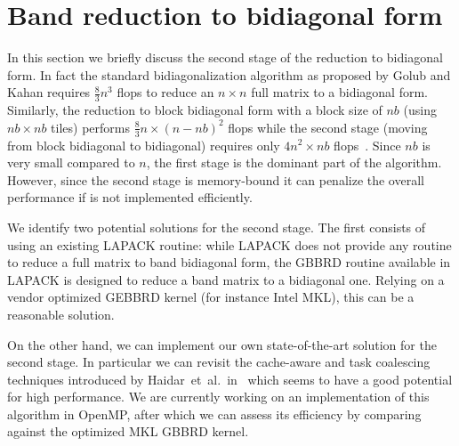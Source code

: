 \section{Band reduction to bidiagonal form}\label{sec:bidiag}
In this section we briefly discuss the second stage of the reduction
to bidiagonal form.
In fact the standard bidiagonalization
algorithm as proposed by Golub and Kahan requires $\frac{8}{3}n^3$
flops to reduce an $n \times n$ full matrix to a bidiagonal form.
Similarly, the reduction to block bidiagonal form with a
block size of $nb$ (using $nb \times nb$ tiles) performs
$\frac{8}{3} n\times (n-nb)^2$ flops while the second stage
(moving from block bidiagonal to bidiagonal)
requires only $4 n^2\times nb$ flops~\cite{ltaief2013high}.
Since $nb$ is very small compared to $n$,
the first stage is the dominant part of the algorithm.
However, since the second stage is memory-bound it can penalize the
overall performance if is not implemented efficiently.

We identify two potential solutions for the second stage.
The first consists of using an existing LAPACK routine:
while LAPACK does not provide any routine to reduce a
full matrix to band bidiagonal form,
the GBBRD routine available in LAPACK is designed to
reduce a band matrix to a bidiagonal one.
Relying on a vendor optimized GEBBRD kernel
(for instance Intel MKL), this can be a reasonable solution.

On the other hand, we can implement our own state-of-the-art
solution for the second stage.
In particular we can revisit the cache-aware
and task coalescing techniques introduced by
Haidar~et~al\@.~in~\cite{haidar2011parallel}
which seems to have a good potential for high performance.
We are currently working on an implementation of this
algorithm in OpenMP,
after which we can assess its efficiency by
comparing against the optimized MKL GBBRD kernel.
